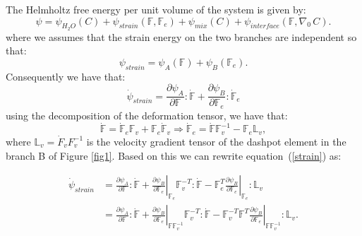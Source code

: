 \documentclass[12pt]{extarticle}
\newcommand{\F}{\ensuremath{\mathbb{F}}}
\newcommand{\LL}{\ensuremath{\mathbb{L}}}
\begin{document}
The Helmholtz free energy per unit volume of the system is given by:
\begin{equation}
\psi = \psi_{H_2O}(C) + \psi_{strain}(\F,\F_e) + \psi_{mix}(C) + \psi_{interface}(\F,\nabla_0 \, C).
\end{equation}
where we assumes that the strain energy on the two branches are independent so that:
\begin{equation}
\psi_{strain}=\psi_{A}(\F)+\psi_{B}(\F_e).
\label{strain}
\end{equation}
Consequently we have that:
\begin{equation}
\dot{\psi}_{strain}= \frac{\partial \psi_A}{\partial \F}:\dot{\F} +  \frac{\partial \psi_B}{\partial \F_e}:\dot{\F}_e
\end{equation}
using the decomposition of the deformation tensor, we have that:
\begin{equation}
\dot{\F}=\dot{\F}_e\F_v+\F_e\dot{\F}_v \Longrightarrow \dot{\F}_e=\dot{\F}\F_v^{-1}-\F_e \LL_v,
\end{equation}
where $\LL_v=\dot{F}_vF_v^{-1}$ is the velocity gradient tensor of the dashpot element in the branch B of Figure \ref{fig1}. Based on this we can rewrite equation~(\ref{strain}) as:

\begin{equation}
\begin{aligned}
\dot{\psi}_{strain} &= \frac{\partial \psi_A}{\partial \F}:\dot{\F} +  \left.\frac{\partial \psi_B}{\partial \F_e}\right|_{\F_e}\F_v^{-T}:\dot{\F}-\F_e^T\left.\frac{\partial \psi_B}{\partial \F_e}\right|_{\F_e}:\LL_v \\
&=  \frac{\partial \psi_A}{\partial \F}:\dot{\F} +  \left.\frac{\partial \psi_B}{\partial \F_e}\right|_{\F\F_v^{-1}}\F_v^{-T}:\dot{\F}-\F_v^{-T}\F^T\left.\frac{\partial \psi_B}{\partial \F_e}\right|_{\F\F_v^{-1}}:\LL_v.
\end{aligned}
\end{equation}
\end{document}
